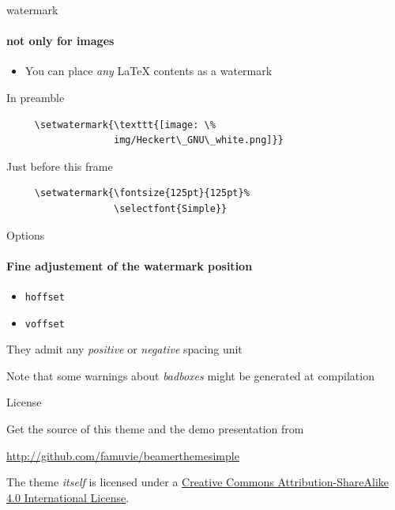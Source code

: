 \documentclass{beamer}
\begin{document}
\begin{frame}[fragile]{watermark}
  \framesubtitle{not only for images}

  \begin{itemize}
    \item You can place \emph{any} \LaTeX{} \alert{contents} as a watermark
  \end{itemize}

  \begin{block}{In preamble}
    \begin{verbatim}
     \setwatermark{\texttt{[image: \%
                   img/Heckert\_GNU\_white.png]}}
    \end{verbatim}
  \end{block}

  \begin{block}{Just before this frame}
    \begin{verbatim}
     \setwatermark{\fontsize{125pt}{125pt}%
                   \selectfont{Simple}}
    \end{verbatim}
  \end{block}


\end{frame}



\setwatermark[hoffset=-3cm,voffset=-2cm]{\fontsize{125pt}{125pt}\selectfont{Simple}}


\begin{frame}{Options}
  \framesubtitle{Fine adjustement of the watermark position}

  
  \begin{itemize}
    \item \texttt{hoffset}
    \item \texttt{voffset}
  \end{itemize}
  
  They admit any \emph{positive} or \emph{negative} spacing \alert{unit}
  
  Note that some \alert{warnings} about \emph{badboxes} might be generated at compilation

\end{frame}




\begin{frame}{License}

  \begin{block}{Get the source of this theme and the demo presentation from}

  \begin{center}\url{http://github.com/famuvie/beamerthemesimple}\end{center}

  \end{block}
  
  The theme \emph{itself} is licensed under a
  \href{http://creativecommons.org/licenses/by-sa/4.0/}{Creative Commons
  Attribution-ShareAlike 4.0 International License}.

  \begin{center}\ccbysa\end{center}

\end{frame}
\end{document}
